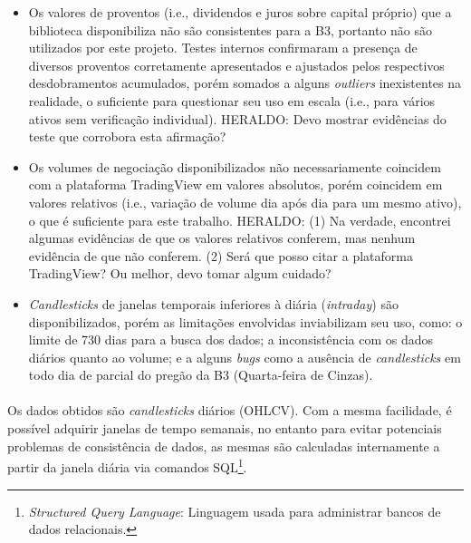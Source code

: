 \begin{itemize}
    \item Os valores de proventos (i.e., dividendos e juros sobre capital próprio) que a biblioteca disponibiliza não são consistentes para a B3, portanto não são utilizados por este projeto. Testes internos confirmaram a presença de diversos proventos corretamente apresentados e ajustados pelos respectivos desdobramentos acumulados, porém somados a alguns \textit{outliers} inexistentes na realidade, o suficiente para questionar seu uso em escala (i.e., para vários ativos sem verificação individual). \color{red} HERALDO: Devo mostrar evidências do teste que corrobora esta afirmação? 

    \item Os volumes de negociação disponibilizados não necessariamente coincidem com a plataforma TradingView em valores absolutos, porém coincidem em valores relativos (i.e., variação de volume dia após dia para um mesmo ativo), o que é suficiente para este trabalho. \color{red} HERALDO: (1) Na verdade, encontrei algumas evidências de que os valores relativos conferem, mas nenhum evidência de que não conferem. (2) Será que posso citar a plataforma TradingView? Ou melhor, devo tomar algum cuidado? 

    \item \textit{Candlesticks} de janelas temporais inferiores à diária (\textit{intraday}) são disponibilizados, porém as limitações envolvidas inviabilizam seu uso, como: o limite de 730 dias para a busca dos dados; a inconsistência com os dados diários quanto ao volume; e a alguns \textit{bugs} como a ausência de \textit{candlesticks} em todo dia de parcial do pregão da B3 (Quarta-feira de Cinzas).
\end{itemize}

\paragraph{} Os dados obtidos são \textit{candlesticks} diários (OHLCV). Com a mesma facilidade, é possível adquirir janelas de tempo semanais, no entanto para evitar potenciais problemas de consistência de dados, as mesmas são calculadas internamente a partir da janela diária via comandos SQL\footnote{\textit{Structured Query Language}: Linguagem usada para administrar bancos de dados relacionais.}.

